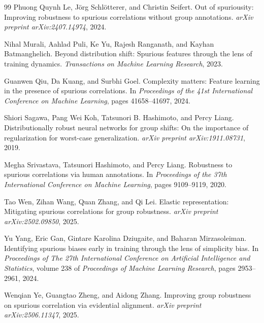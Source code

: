\documentclass{article}
\begin{document}
\begin{thebibliography}{99}
Phuong Quynh Le, J{\"o}rg Schl{\"o}tterer, and Christin Seifert.
\newblock Out of spuriousity: Improving robustness to spurious correlations without group annotations.
\newblock \emph{arXiv preprint arXiv:2407.14974}, 2024.

Nihal Murali, Aahlad Puli, Ke Yu, Rajesh Ranganath, and Kayhan Batmanghelich.
\newblock Beyond distribution shift: Spurious features through the lens of training dynamics.
\newblock \emph{Transactions on Machine Learning Research}, 2023.

Guanwen Qiu, Da Kuang, and Surbhi Goel.
\newblock Complexity matters: Feature learning in the presence of spurious correlations.
\newblock In \emph{Proceedings of the 41st International Conference on Machine Learning}, pages 41658--41697, 2024.

Shiori Sagawa, Pang Wei Koh, Tatsunori B. Hashimoto, and Percy Liang.
\newblock Distributionally robust neural networks for group shifts: On the importance of regularization for worst-case generalization.
\newblock \emph{arXiv preprint arXiv:1911.08731}, 2019.

Megha Srivastava, Tatsunori Hashimoto, and Percy Liang.
\newblock Robustness to spurious correlations via human annotations.
\newblock In \emph{Proceedings of the 37th International Conference on Machine Learning}, pages 9109--9119, 2020.

Tao Wen, Zihan Wang, Quan Zhang, and Qi Lei.
\newblock Elastic representation: Mitigating spurious correlations for group robustness.
\newblock \emph{arXiv preprint arXiv:2502.09850}, 2025.

Yu Yang, Eric Gan, Gintare Karolina Dziugaite, and Baharan Mirzasoleiman.
\newblock Identifying spurious biases early in training through the lens of simplicity bias.
\newblock In \emph{Proceedings of The 27th International Conference on Artificial Intelligence and Statistics}, volume 238 of \emph{Proceedings of Machine Learning Research}, pages 2953--2961, 2024.

Wenqian Ye, Guangtao Zheng, and Aidong Zhang.
\newblock Improving group robustness on spurious correlation via evidential alignment.
\newblock \emph{arXiv preprint arXiv:2506.11347}, 2025.


\end{thebibliography}
\end{document}
